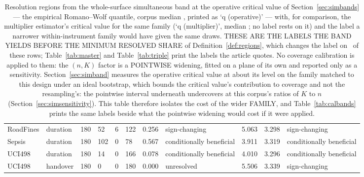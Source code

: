 \begin{landscape}
\begin{table}[t]
{\begin{tabular}{llllllrlrrl}
RoadFines & duration & 180 & 52 & 6 & 122 & 0.256 & sign-changing & 5.063 & 3.298 & sign-changing \\
Sepsis & duration & 180 & 102 & 0 & 78 & 0.567 & conditionally beneficial & 3.911 & 3.319 & conditionally beneficial \\
UCI498 & duration & 180 & 14 & 0 & 166 & 0.078 & conditionally beneficial & 4.010 & 3.296 & conditionally beneficial \\
UCI498 & handover & 180 & 0 & 0 & 180 & 0.000 & unresolved & 5.506 & 3.339 & sign-changing \\
\bottomrule
\end{tabular}%
}
\caption{Resolution regions from the whole-surface simultaneous band at the operative critical value of Section~\ref{sec:simbands} --- the empirical Romano--Wolf quantile, corpus median \maxTSurfaceMedian, printed as `q (operative)' --- with, for comparison, the multiplier estimator's critical value for the same family (`q (multiplier)', median \maxTSurfaceMultMedian; no label rests on it) and the label a narrower within-instrument family would have given the same draws. THESE ARE THE LABELS THE BAND YIELDS BEFORE THE MINIMUM RESOLVED SHARE of Definition~\ref{def:regions}, which changes the label on \nMarkedBelowMinShare\ of these rows; Table~\ref{tab:master} and Table~\ref{tab:triple} print the labels the article quotes. No coverage calibration is applied to them: the $(n,K)$ factor is a POINTWISE widening, fitted on a plane of its own and reported only as a sensitivity. Section~\ref{sec:simband} measures the operative critical value at about its level on the family matched to this design under an ideal bootstrap, which bounds the critical value's contribution to coverage and not the resampling's: the pointwise interval underneath undercovers at this corpus's ratios of $K$ to $n$ (Section~\ref{sec:simsensitivity}). This table therefore isolates the cost of the wider FAMILY, and Table~\ref{tab:calbands} prints the same labels beside what the pointwise widening would cost if it were applied.}
\label{tab:regions}
\end{table}
\end{landscape}
